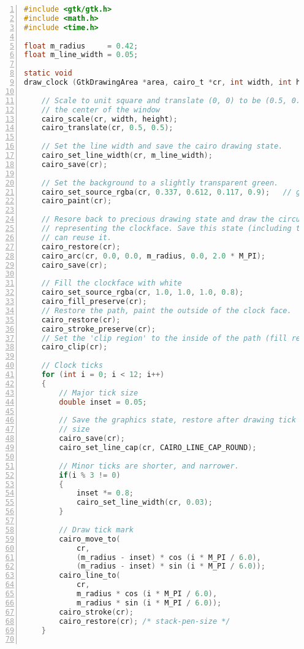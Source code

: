 \begin{lstlisting}[language=C, numbers=left]
#include <gtk/gtk.h>
#include <math.h>
#include <time.h>

float m_radius     = 0.42;
float m_line_width = 0.05;

static void
draw_clock (GtkDrawingArea *area, cairo_t *cr, int width, int height, gpointer user_data) {

    // Scale to unit square and translate (0, 0) to be (0.5, 0.5), i.e.
    // the center of the window
    cairo_scale(cr, width, height);
    cairo_translate(cr, 0.5, 0.5);

    // Set the line width and save the cairo drawing state.
    cairo_set_line_width(cr, m_line_width);
    cairo_save(cr);

    // Set the background to a slightly transparent green.
    cairo_set_source_rgba(cr, 0.337, 0.612, 0.117, 0.9);   // green
    cairo_paint(cr);

    // Resore back to precious drawing state and draw the circular path
    // representing the clockface. Save this state (including the path) so we
    // can reuse it.
    cairo_restore(cr);
    cairo_arc(cr, 0.0, 0.0, m_radius, 0.0, 2.0 * M_PI);
    cairo_save(cr);

    // Fill the clockface with white
    cairo_set_source_rgba(cr, 1.0, 1.0, 1.0, 0.8);
    cairo_fill_preserve(cr);
    // Restore the path, paint the outside of the clock face.
    cairo_restore(cr);
    cairo_stroke_preserve(cr);
    // Set the 'clip region' to the inside of the path (fill region).
    cairo_clip(cr);

    // Clock ticks
    for (int i = 0; i < 12; i++)
    {
        // Major tick size
        double inset = 0.05;

        // Save the graphics state, restore after drawing tick to maintain pen
        // size
        cairo_save(cr);
        cairo_set_line_cap(cr, CAIRO_LINE_CAP_ROUND);

        // Minor ticks are shorter, and narrower.
        if(i % 3 != 0)
        {
            inset *= 0.8;
            cairo_set_line_width(cr, 0.03);
        }

        // Draw tick mark
        cairo_move_to(
            cr,
            (m_radius - inset) * cos (i * M_PI / 6.0),
            (m_radius - inset) * sin (i * M_PI / 6.0));
        cairo_line_to(
            cr,
            m_radius * cos (i * M_PI / 6.0),
            m_radius * sin (i * M_PI / 6.0));
        cairo_stroke(cr);
        cairo_restore(cr); /* stack-pen-size */
    }


\end{lstlisting}
